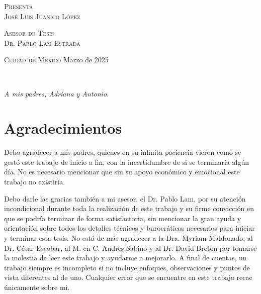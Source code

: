 \vspace{5pt}

\begin{center}
    \begin{minipage}{0.7\textwidth}
        \centering
        {\normalsize\textsc{Presenta}} \\
        {\Large\textsc{José Luis Juanico López}}
        \medskip
    \end{minipage}
\end{center}

\hspace{10pt}

\begin{center}
    \begin{minipage}{0.7\textwidth}
        \centering
        {\normalsize\textsc{Asesor de Tesis}} \\
        {\normalsize\textsc{Dr. Pablo Lam Estrada}}
        \medskip
    \end{minipage}
\end{center}

\vfill

\begin{center}
    \begin{minipage}{0.8\textwidth}
        {\normalsize\textsc{Cuidad de México} \hfill {\small Marzo de 2025}}
    \end{minipage}
\end{center}

\newpage
\thispagestyle{empty}
\

\newpage
{}
\thispagestyle{empty}
\hfill\textit{A mis padres, Adriana y Antonio.}
\newpage
\thispagestyle{empty}
\

\newpage
{}
\thispagestyle{plain}
\section*{Agradecimientos}

Debo agradecer a mis padres, quienes en su infinita paciencia vieron como se gestó este trabajo de inicio a fin, con la incertidumbre de si se terminaría algún día. No es necesario mencionar que sin su apoyo económico y emocional este trabajo no existiría.
\bigskip

Debo darle las gracias también a mi asesor, el Dr. Pablo Lam, por su atención incondicional durante toda la realización de este trabajo y su firme convicción en que se podría terminar de forma satisfactoria, sin mencionar la gran ayuda y orientación sobre todos los detalles técnicos y burocráticos necesarios para iniciar y terminar esta tesis. No está de más agradecer a la Dra. Myriam Maldonado, al Dr. César Escobar, al M. en C. Andrés Sabino y al Dr. David Bretón por tomarse la molestia de leer este trabajo y ayudarme a mejorarlo. A final de cuentas, un trabajo siempre es incompleto si no incluye enfoques, observaciones y puntos de vista diferentes al de uno. Cualquier error que se encuentre en este trabajo recae únicamente sobre mi.
\bigskip

